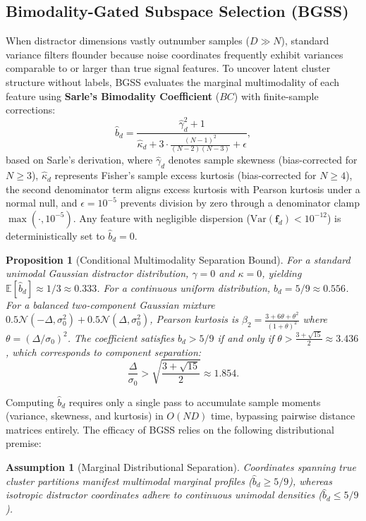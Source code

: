 \documentclass[pdflatex,sn-mathphys-num]{sn-jnl}
\theoremstyle{thmstyleone}
\newtheorem{proposition}[theorem]{Proposition}
\theoremstyle{thmstyletwo}
\theoremstyle{thmstylethree}
\newtheorem{assumption}{Assumption}
\begin{document}
\subsection{Bimodality-Gated Subspace Selection (BGSS)}\label{sec:bgss}
When distractor dimensions vastly outnumber samples ($D \gg N$), standard variance filters flounder because noise coordinates frequently exhibit variances comparable to or larger than true signal features. To uncover latent cluster structure without labels, BGSS evaluates the marginal multimodality of each feature using \textbf{Sarle's Bimodality Coefficient} ($BC$) with finite-sample corrections:
\begin{equation}\label{eq:sarle_bc}
 \hat{b}_d = \frac{\hat{\gamma}_d^2 + 1}{\hat{\kappa}_d + 3 \cdot \frac{(N-1)^2}{(N-2)(N-3)} + \epsilon},
\end{equation}
based on Sarle's derivation, where $\hat{\gamma}_d$ denotes sample skewness (bias-corrected for $N \ge 3$), $\hat{\kappa}_d$ represents Fisher's sample excess kurtosis (bias-corrected for $N \ge 4$), the second denominator term aligns excess kurtosis with Pearson kurtosis under a normal null, and $\epsilon = 10^{-5}$ prevents division by zero through a denominator clamp $\max(\cdot, 10^{-5})$. Any feature with negligible dispersion ($\mathrm{Var}(\mathbf{f}_d) < 10^{-12}$) is deterministically set to $\hat{b}_d = 0$.

\begin{proposition}[Conditional Multimodality Separation Bound]\label{prop:multimodal_bound}
For a standard unimodal Gaussian distractor distribution, $\gamma = 0$ and $\kappa = 0$, yielding $\mathbb{E}[\hat{b}_d] \approx 1/3 \approx 0.333$. For a continuous uniform distribution, $b_d = 5/9 \approx 0.556$. For a balanced two-component Gaussian mixture $0.5\mathcal{N}(-\Delta, \sigma_0^2) + 0.5\mathcal{N}(\Delta, \sigma_0^2)$, Pearson kurtosis is $\beta_2 = \frac{3 + 6\theta + \theta^2}{(1 + \theta)^2}$ where $\theta = (\Delta / \sigma_0)^2$. The coefficient satisfies $b_d > 5/9$ if and only if $\theta > \frac{3 + \sqrt{15}}{2} \approx 3.436$, which corresponds to component separation:
\begin{equation}
 \frac{\Delta}{\sigma_0} > \sqrt{\frac{3 + \sqrt{15}}{2}} \approx 1.854.
\end{equation}
\end{proposition}

Computing $\hat{b}_d$ requires only a single pass to accumulate sample moments (variance, skewness, and kurtosis) in $O(ND)$ time, bypassing pairwise distance matrices entirely. The efficacy of BGSS relies on the following distributional premise:
\begin{assumption}[Marginal Distributional Separation]\label{assump:multimodal}
Coordinates spanning true cluster partitions manifest multimodal marginal profiles ($\hat{b}_d \ge 5/9$), whereas isotropic distractor coordinates adhere to continuous unimodal densities ($\hat{b}_d \le 5/9$).
\end{assumption}
\end{document}
